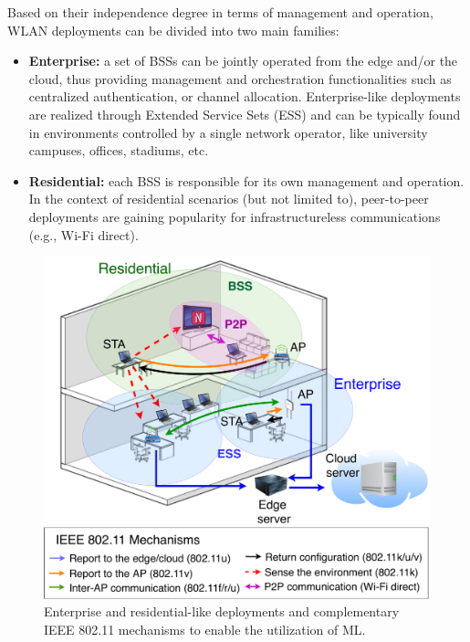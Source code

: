 \documentclass[journal]{IEEEtran}
\begin{document}
Based on their independence degree in terms of management and operation, WLAN deployments can be divided into two main families:
\begin{itemize}
	\item \textbf{Enterprise:} a set of BSSs can be jointly operated from the edge and/or the cloud, thus providing management and orchestration functionalities such as centralized authentication, or channel allocation. Enterprise-like deployments are realized through Extended Service Sets (ESS) and can be typically found in environments controlled by a single network operator, like university campuses, offices, stadiums, etc. 
	\item \textbf{Residential:} each BSS is responsible for its own management and operation. In the context of residential scenarios (but not limited to), peer-to-peer deployments are gaining popularity for infrastructureless communications (e.g., Wi-Fi direct).
\end{itemize}

\begin{figure}[ht!]
	\centering
	\includegraphics[width=\columnwidth]{overview_learning_approaches}
	\caption{Enterprise and residential-like deployments and complementary IEEE 802.11 mechanisms to enable the utilization of ML.}
	\label{fig:overview_learning_approaches}
\end{figure}
\end{document}
